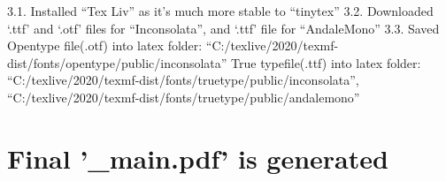 \documentclass[
]{article}
\begin{document}
3.1. Installed ``Tex Liv'' as it's much more stable to ``tinytex'' 3.2.
Downloaded `.ttf' and `.otf' files for ``Inconsolata'', and `.ttf' file
for ``AndaleMono'' 3.3. Saved Opentype file(.otf) into latex folder:
``C:/texlive/2020/texmf-dist/fonts/opentype/public/inconsolata'' True
typefile(.ttf) into latex folder:
``C:/texlive/2020/texmf-dist/fonts/truetype/public/inconsolata'',
``C:/texlive/2020/texmf-dist/fonts/truetype/public/andalemono''

\hypertarget{final-_main.pdf-is-generated}{%
\section{Final '\_main.pdf' is
generated}\label{final-_main.pdf-is-generated}}
\end{document}
